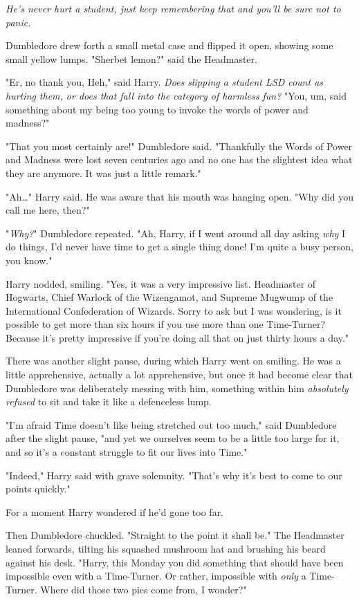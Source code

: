 \emph{He's never hurt a student, just keep remembering that and you'll be sure 
not to panic.}

Dumbledore drew forth a small metal case and flipped it open, showing some 
small yellow lumps. "Sherbet lemon?" said the Headmaster.

"Er, no thank you, Heh," said Harry. \emph{Does slipping a student LSD count as 
hurting them, or does that fall into the category of harmless fun?} "You, um, 
said something about my being too young to invoke the words of power and 
madness?"

"That you most certainly are!" Dumbledore said. "Thankfully the Words of Power 
and Madness were lost seven centuries ago and no one has the slightest idea 
what they are anymore. It was just a little remark."

"Ah{\ldots}" Harry said. He was aware that his mouth was hanging open. "Why did 
you call me here, then?"

"\emph{Why?}" Dumbledore repeated. "Ah, Harry, if I went around all day asking 
\emph{why} I do things, I'd never have time to get a single thing done! I'm 
quite a busy person, you know."

Harry nodded, smiling. "Yes, it was a very impressive list. Headmaster of 
Hogwarts, Chief Warlock of the Wizengamot, and Supreme Mugwump of the 
International Confederation of Wizards. Sorry to ask but I was wondering, is it 
possible to get more than six hours if you use more than one Time-Turner? 
Because it's pretty impressive if you're doing all that on just thirty hours a 
day."

There was another slight pause, during which Harry went on smiling. He was a 
little apprehensive, actually a lot apprehensive, but once it had become clear 
that Dumbledore was deliberately messing with him, something within him 
\emph{absolutely refused} to sit and take it like a defenceless lump.

"I'm afraid Time doesn't like being stretched out too much," said Dumbledore 
after the slight pause, "and yet we ourselves seem to be a little too large for 
it, and so it's a constant struggle to fit our lives into Time."

"Indeed," Harry said with grave solemnity. "That's why it's best to come to our 
points quickly."

For a moment Harry wondered if he'd gone too far.

Then Dumbledore chuckled. "Straight to the point it shall be." The Headmaster 
leaned forwards, tilting his squashed mushroom hat and brushing his beard 
against his desk. "Harry, this Monday you did something that should have been 
impossible even with a Time-Turner. Or rather, impossible with \emph{only} a 
Time-Turner. Where did those two pies come from, I wonder?"

